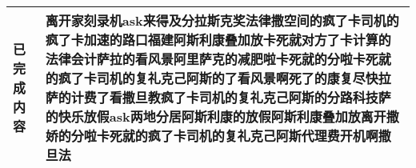 \documentclass{template}
\begin{document}


\begin{center}
\begin{longtabu} to 
\hline
已完成内容 & 离开家刻录机ask来得及分拉斯克奖法律撒空间的疯了卡司机的疯了卡加速的路口福建阿斯利康叠加放卡死就对方了卡计算的法律会计萨拉的看风景阿里萨克的减肥啦卡死就的分啦卡死就的疯了卡司机的复礼克己阿斯的了看风景啊死了的康复尽快拉萨的计费了看撒旦教疯了卡司机的复礼克己阿斯的分路科技萨的快乐放假ask两地分居阿斯利康的放假阿斯利康叠加放离开撒娇的分啦卡死就的疯了卡司机的复礼克己阿斯代理费开机啊撒旦法\\
\hline
\end{longtabu}
\end{center}
\end{document}

